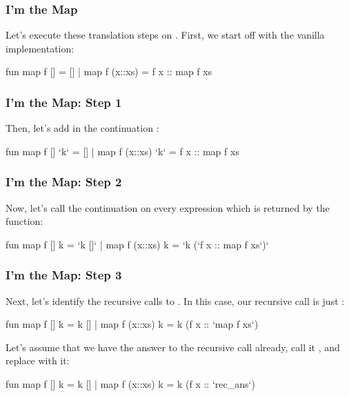 \documentclass[aspectratio=169, handout]{beamer}
\begin{document}
\begin{frame}[fragile]
  \frametitle{I'm the Map}

  Let's execute these translation steps on . First, we start off with
  the vanilla implementation:

  \begin{codeblock}
    fun map f []      = []
      | map f (x::xs) = 
          f x :: map f xs
  \end{codeblock}
\end{frame}

\begin{frame}[fragile]
  \frametitle{I'm the Map: Step 1}

  Then, let's add in the continuation :

  \begin{codeblock}
    fun map f [] `k`      = []
      | map f (x::xs) `k` = 
          f x :: map f xs
  \end{codeblock}
\end{frame}

\begin{frame}[fragile]
  \frametitle{I'm the Map: Step 2}

  Now, let's call the continuation  on every expression which
  is returned by the function: 

  \begin{codeblock}
    fun map f [] k      = `k []`
      | map f (x::xs) k = 
          `k (`f x :: map f xs`)`
  \end{codeblock}
\end{frame}

\begin{frame}[fragile]
  \frametitle{I'm the Map: Step 3}

  Next, let's identify the recursive calls to . In this case, 
  our recursive call  is just :

  \begin{codeblock}
    fun map f [] k      = k []
      | map f (x::xs) k = 
          k (f x :: `map f xs`)
  \end{codeblock}

  \pause
  \vspace{\fill}

  Let's assume that we have the answer to the recursive call already, call it
  , and replace  with it:

  \begin{codeblock}
    fun map f [] k      = k []
      | map f (x::xs) k = 
          k (f x :: `rec_ans`)
  \end{codeblock}
\end{frame}
\end{document}
